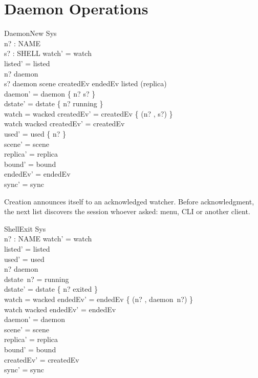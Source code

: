 \documentclass[a4paper,10pt,fleqn]{article}
\begin{document}
\section{Daemon Operations}

\begin{schema}{DaemonNew}
  \Delta Sys \\
  n? : NAME \\
  s? : SHELL
\where
  watch' = watch \\
  listed' = listed \\
  n? \notin \dom daemon \\
  s? \notin \ran daemon \cup \ran scene \cup \ran createdEv \cup
    \ran endedEv \cup \ran listed \cup \ran (\dom replica) \\
  daemon' = daemon \cup \{ n? \mapsto s? \} \\
  dstate' = dstate \cup \{ n? \mapsto running \} \\
  watch = wacked \implies createdEv' = createdEv \cup \{ (n? , s?) \} \\
  watch \neq wacked \implies createdEv' = createdEv \\
  used' = used \cup \{ n? \} \\
  scene' = scene \\
  replica' = replica \\
  bound' = bound \\
  endedEv' = endedEv \\
  sync' = sync
\end{schema}

Creation announces itself to an acknowledged watcher. Before acknowledgment,
the next list discovers the session whoever asked: menu, CLI or another client.

\begin{schema}{ShellExit}
  \Delta Sys \\
  n? : NAME
\where
  watch' = watch \\
  listed' = listed \\
  used' = used \\
  n? \in \dom daemon \\
  dstate~n? = running \\
  dstate' = dstate \oplus \{ n? \mapsto exited \} \\
  watch = wacked \implies endedEv' = endedEv \cup \{ (n? , daemon~n?) \} \\
  watch \neq wacked \implies endedEv' = endedEv \\
  daemon' = daemon \\
  scene' = scene \\
  replica' = replica \\
  bound' = bound \\
  createdEv' = createdEv \\
  sync' = sync
\end{schema}
\end{document}
